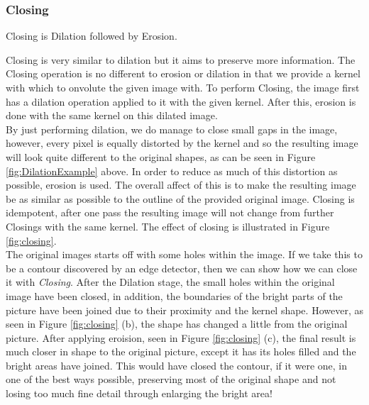 \documentclass[11pt]{report}
\begin{document}
\subsubsection*{Closing}
\begin{center}
Closing is Dilation followed by Erosion.
\end{center}
Closing is very similar to dilation but it aims to preserve more information.
The Closing operation is no different to erosion or dilation in that we
provide a kernel with which to onvolute the given image with. To perform Closing,
the image first has a dilation operation applied to it with the given kernel. 
After this, erosion is done with the same kernel on this dilated image. \\
By just performing dilation, we do manage to close small gaps in the image, 
however, every pixel is equally distorted by the kernel and so the resulting
image will look quite different to the original shapes, as can be seen
in Figure \ref{fig:DilationExample} above. In order to reduce as much
of this distortion as possible, erosion is used. The overall affect of this is
to make the resulting image be as similar as possible to the outline of the
provided original image. Closing is idempotent, after one pass the resulting
image will not change from further Closings with the same kernel. The effect 
of closing is illustrated in Figure \ref{fig:closing}.\\
The original images starts off with some holes within the image. If we
take this to be a contour discovered by an edge detector, then we can show
how we can close it with \textit{Closing}. After the Dilation stage, the
small holes within the original image have been closed, in addition, the 
boundaries of the bright parts of the picture have been joined due to their
proximity and the kernel shape. However, as seen in Figure \ref{fig:closing} (b),
the shape has changed a little from the original picture. After applying
eroision, seen in Figure \ref{fig:closing} (c), the final result is much closer
in shape to the original picture, except it has its holes filled and the 
bright areas have joined. This would have closed the contour, if it were one,
in one of the best ways possible, preserving most of the original shape and not
losing too much fine detail through enlarging the bright area!
\end{document}
